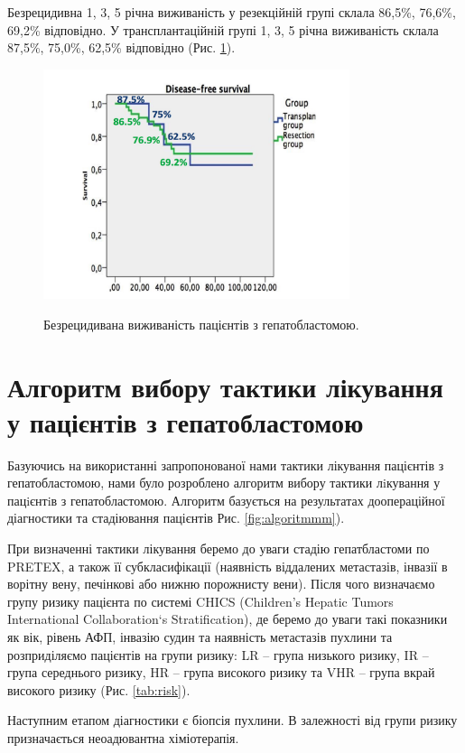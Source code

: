 Безрецидивна 1, 3, 5 річна виживаність у резекційній групі склала 86,5\%, 76,6\%, 69,2\% відповідно. У трансплантаційній групі 1, 3, 5 річна виживаність склала 87,5\%, 75,0\%, 62,5\% відповідно (Рис. \ref{fig:dfs1}).

\begin{figure}[h]
\caption{Безрецидивана виживаність пацієнтів з гепатобластомою.}
\centering
\includegraphics[width=0.8\textwidth]{Illustrations/dfs1.jpg}
\label{fig:dfs1} 
\end{figure}

\section{Алгоритм вибору тактики лікування у пацієнтів з гепатобластомою}
Базуючись на використанні запропонованої нами тактики лікування пацієнтів з гепатобластомою, нами було розроблено алгоритм вибору тактики лiкування у пацiєнтiв з гепатобластомою. Алгоритм базується на результатах доопераційної діагностики та стадіювання пацієнтів Рис. \ref{fig:algoritmmm}).

При визначенні тактики лікування беремо до уваги стадію гепатбластоми по PRETEX, а також її субкласифікації (наявність віддалених метастазів, інвазії в ворітну вену, печінкові або нижню порожнисту вени). 
Після чого визначаємо групу ризику пацієнта по системі CHICS (Children’s Hepatic Tumors International Collaboration`s Stratification), де беремо до уваги такі показники як вік, рівень АФП, інвазію судин та наявність метастазів пухлини та розприділяємо пацієнтів на групи ризику: LR – група низького ризику, IR – група середнього ризику, HR – група високого ризику та VHR – група вкрай високого ризику (Рис. \ref{tab:risk}).

Наступним етапом діагностики є біопсія пухлини. 
В залежності від групи ризику призначається неоадювантна хіміотерапія. 

